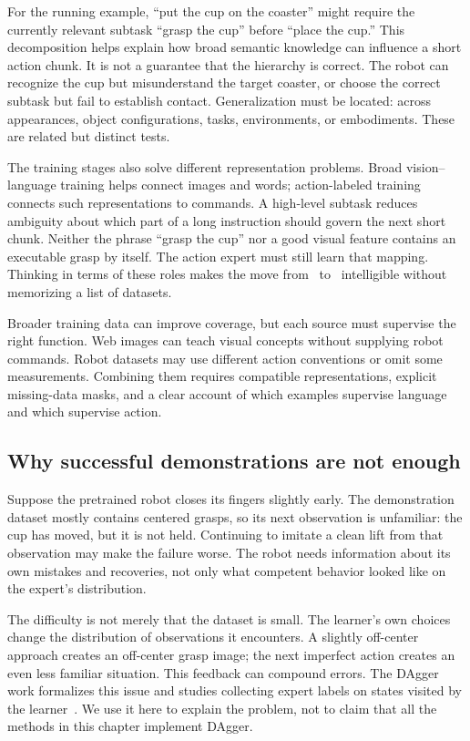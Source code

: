 For the running example, ``put the cup on the coaster'' might require the currently relevant subtask ``grasp the cup'' before ``place the cup.'' This decomposition helps explain how broad semantic knowledge can influence a short action chunk. It is not a guarantee that the hierarchy is correct. The robot can recognize the cup but misunderstand the target coaster, or choose the correct subtask but fail to establish contact. Generalization must be located: across appearances, object configurations, tasks, environments, or embodiments. These are related but distinct tests.

The training stages also solve different representation problems. Broad vision--language training helps connect images and words; action-labeled training connects such representations to commands. A high-level subtask reduces ambiguity about which part of a long instruction should govern the next short chunk. Neither the phrase ``grasp the cup'' nor a good visual feature contains an executable grasp by itself. The action expert must still learn that mapping. Thinking in terms of these roles makes the move from \piz\ to \pih\ intelligible without memorizing a list of datasets.

Broader training data can improve coverage, but each source must supervise the right function. Web images can teach visual concepts without supplying robot commands. Robot datasets may use different action conventions or omit some measurements. Combining them requires compatible representations, explicit missing-data masks, and a clear account of which examples supervise language and which supervise action.

\subsection{Why successful demonstrations are not enough}
Suppose the pretrained robot closes its fingers slightly early. The demonstration dataset mostly contains centered grasps, so its next observation is unfamiliar: the cup has moved, but it is not held. Continuing to imitate a clean lift from that observation may make the failure worse. The robot needs information about its own mistakes and recoveries, not only what competent behavior looked like on the expert's distribution.

The difficulty is not merely that the dataset is small. The learner's own choices change the distribution of observations it encounters. A slightly off-center approach creates an off-center grasp image; the next imperfect action creates an even less familiar situation. This feedback can compound errors. The DAgger work formalizes this issue and studies collecting expert labels on states visited by the learner~\citep{dagger}. We use it here to explain the problem, not to claim that all the methods in this chapter implement DAgger.

